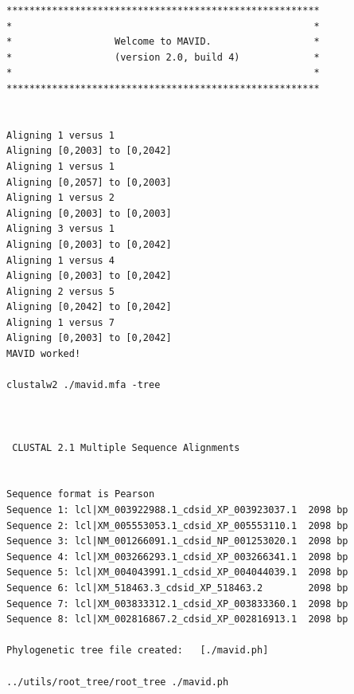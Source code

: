 \documentclass[10.9pt]{article} %
\begin{document}
\begin{verbatim}
*******************************************************
*                                                     *
*                  Welcome to MAVID.                  *
*                  (version 2.0, build 4)             *
*                                                     *
*******************************************************


Aligning 1 versus 1
Aligning [0,2003] to [0,2042]
Aligning 1 versus 1
Aligning [0,2057] to [0,2003]
Aligning 1 versus 2
Aligning [0,2003] to [0,2003]
Aligning 3 versus 1
Aligning [0,2003] to [0,2042]
Aligning 1 versus 4
Aligning [0,2003] to [0,2042]
Aligning 2 versus 5
Aligning [0,2042] to [0,2042]
Aligning 1 versus 7
Aligning [0,2003] to [0,2042]
MAVID worked!

clustalw2 ./mavid.mfa -tree



 CLUSTAL 2.1 Multiple Sequence Alignments


Sequence format is Pearson
Sequence 1: lcl|XM_003922988.1_cdsid_XP_003923037.1  2098 bp
Sequence 2: lcl|XM_005553053.1_cdsid_XP_005553110.1  2098 bp
Sequence 3: lcl|NM_001266091.1_cdsid_NP_001253020.1  2098 bp
Sequence 4: lcl|XM_003266293.1_cdsid_XP_003266341.1  2098 bp
Sequence 5: lcl|XM_004043991.1_cdsid_XP_004044039.1  2098 bp
Sequence 6: lcl|XM_518463.3_cdsid_XP_518463.2        2098 bp
Sequence 7: lcl|XM_003833312.1_cdsid_XP_003833360.1  2098 bp
Sequence 8: lcl|XM_002816867.2_cdsid_XP_002816913.1  2098 bp

Phylogenetic tree file created:   [./mavid.ph]

../utils/root_tree/root_tree ./mavid.ph
\end{verbatim}
\end{document}
